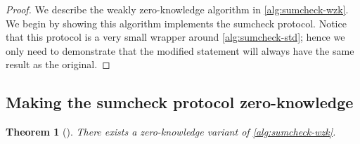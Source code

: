 \documentclass[english,12pt]{reedthesis}
\theoremstyle{plain}
\newtheorem{thm}{Theorem}[section]
\theoremstyle{definition}
\theoremstyle{remark}
\DeclarePairedDelimiter{\abs}{\lvert}{\rvert}
\newcommand{\middlemid}{%
  \ensuremath{\;\middle\vert\;}
}
\begin{document}
\begin{proof}
  We describe the weakly zero-knowledge algorithm in \cref{alg:sumcheck-wzk}. We
  begin by showing this algorithm implements the sumcheck protocol. Notice that
  this protocol is a very small wrapper around \cref{alg:sumcheck-std}; hence we
  only need to demonstrate that the modified statement will always have the same
  result as the original.
\end{proof}

\subsection{Making the sumcheck protocol zero-knowledge}



\begin{thm}[{\cite{CFGS22}}]\label{thm:zk-sumcheck}
  There exists a zero-knowledge variant of \cref{alg:sumcheck-wzk}.
\end{thm}
\end{document}
